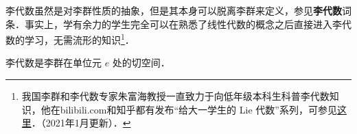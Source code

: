 李代数虽然是对李群性质的抽象，但是其本身可以脱离李群来定义，参见\textbf{李代数}词条．事实上，学有余力的学生完全可以在熟悉了线性代数的概念之后直接进入李代数的学习，无需流形的知识\footnote{我国李群和李代数专家朱富海教授一直致力于向低年级本科生科普李代数知识，他在bilibili.com和知乎都有发布“给大一学生的 Lie 代数”系列，可参见\href{https://space.bilibili.com/509086270?from=search&seid=2394735306274350134和https://zhuanlan.zhihu.com/p/161735986}{这里}．（2021年1月更新）．}．

李代数是李群在单位元 $e$ 处的切空间．




